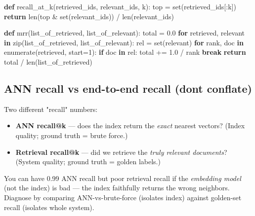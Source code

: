 \documentclass[11pt]{article}
\providecommand{\tightlist}{\setlength{\itemsep}{1pt}\setlength{\parskip}{0pt}}
\newenvironment{Shaded}{\begin{snugshade}}{\end{snugshade}}
\newcommand{\BuiltInTok}[1]{\textcolor[rgb]{0.50,0.55,0.55}{#1}}
\newcommand{\ControlFlowTok}[1]{\textcolor[rgb]{0.99,0.74,0.29}{\textbf{#1}}}
\newcommand{\DecValTok}[1]{\textcolor[rgb]{0.96,0.45,0.00}{#1}}
\newcommand{\FloatTok}[1]{\textcolor[rgb]{0.96,0.45,0.00}{#1}}
\newcommand{\KeywordTok}[1]{\textcolor[rgb]{0.81,0.81,0.76}{\textbf{#1}}}
\newcommand{\NormalTok}[1]{\textcolor[rgb]{0.81,0.81,0.76}{#1}}
\newcommand{\OperatorTok}[1]{\textcolor[rgb]{0.81,0.81,0.76}{#1}}
\begin{document}
\begin{Shaded}
\begin{Highlighting}[]
\KeywordTok{def}\NormalTok{ recall\_at\_k(retrieved\_ids, relevant\_ids, k):}
\NormalTok{    top }\OperatorTok{=} \BuiltInTok{set}\NormalTok{(retrieved\_ids[:k])}
    \ControlFlowTok{return} \BuiltInTok{len}\NormalTok{(top }\OperatorTok{\&} \BuiltInTok{set}\NormalTok{(relevant\_ids)) }\OperatorTok{/} \BuiltInTok{len}\NormalTok{(relevant\_ids)}

\KeywordTok{def}\NormalTok{ mrr(list\_of\_retrieved, list\_of\_relevant):}
\NormalTok{    total }\OperatorTok{=} \FloatTok{0.0}
    \ControlFlowTok{for}\NormalTok{ retrieved, relevant }\KeywordTok{in} \BuiltInTok{zip}\NormalTok{(list\_of\_retrieved, list\_of\_relevant):}
\NormalTok{        rel }\OperatorTok{=} \BuiltInTok{set}\NormalTok{(relevant)}
        \ControlFlowTok{for}\NormalTok{ rank, doc }\KeywordTok{in} \BuiltInTok{enumerate}\NormalTok{(retrieved, start}\OperatorTok{=}\DecValTok{1}\NormalTok{):}
            \ControlFlowTok{if}\NormalTok{ doc }\KeywordTok{in}\NormalTok{ rel:}
\NormalTok{                total }\OperatorTok{+=} \FloatTok{1.0} \OperatorTok{/}\NormalTok{ rank}
                \ControlFlowTok{break}
    \ControlFlowTok{return}\NormalTok{ total }\OperatorTok{/} \BuiltInTok{len}\NormalTok{(list\_of\_retrieved)}
\end{Highlighting}
\end{Shaded}

\subsection{ANN recall vs end-to-end recall (don\textquotesingle t conflate)}\label{ann-recall-vs-end-to-end-recall-dont-conflate}

Two different "recall" numbers:

\begin{itemize}
\tightlist
\item
  \textbf{ANN recall@k} --- does the index return the \emph{exact} nearest vectors? (Index quality; ground truth = brute force.)
\item
  \textbf{Retrieval recall@k} --- did we retrieve the \emph{truly relevant documents}? (System quality; ground truth = golden labels.)
\end{itemize}

You can have 0.99 ANN recall but poor retrieval recall if the \emph{embedding model} (not the index) is bad --- the index faithfully returns the wrong neighbors. Diagnose by comparing ANN-vs-brute-force (isolates index) against golden-set recall (isolates whole system).
\end{document}
